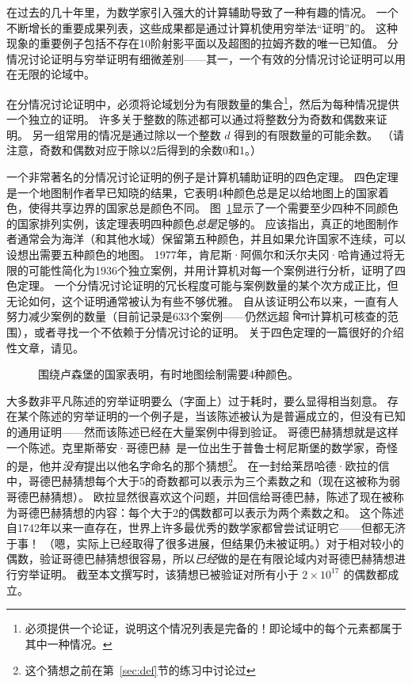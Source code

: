 在过去的几十年里，为数学家引入强大的计算辅助导致了一种有趣的情况。
一个不断增长的重要成果列表，这些成果都是通过计算机使用穷举法“证明”的。
这种现象的重要例子包括不存在10阶射影平面\cite{lam}以及超图的拉姆齐数的唯一已知值\cite{radz}。
分情况讨论证明与穷举证明有细微差别——其一，一个有效的分情况讨论证明可以用在无限的论域中。

在分情况讨论证明中，必须将论域划分为有限数量的集合\footnote{必须提供一个论证，说明这个情况列表是完备的！即论域中的每个元素都属于其中一种情况。}，然后为每种情况提供一个独立的证明。
许多关于整数的陈述都可以通过将整数分为奇数和偶数来证明。
另一组常用的情况是通过除以一个整数 $d$ 得到的有限数量的可能余数。
（请注意，奇数和偶数对应于除以2后得到的余数0和1。）

一个非常著名的分情况讨论证明的例子是计算机辅助证明的四色定理。
四色定理是一个地图制作者早已知晓的结果，它表明4种颜色总是足以给地图上的国家着色，使得共享边界的国家总是颜色不同。
图~\ref{fig:Lux_map}显示了一个需要至少四种不同颜色的国家排列实例，该定理表明四种颜色\emph{总是}足够的。
应该指出，真正的地图制作者通常会为海洋（和其他水域）保留第五种颜色，并且如果允许国家不连续，可以设想出需要五种颜色的地图。
1977年，肯尼斯·阿佩尔和沃尔夫冈·哈肯通过将无限的可能性简化为1936个独立案例，并用计算机对每一个案例进行分析，证明了四色定理。
一个分情况讨论证明的冗长程度可能与案例数量的某个次方成正比，但无论如何，这个证明通常被认为有些不够优雅。
自从该证明公布以来，一直有人努力减少案例的数量（目前记录是633个案例——仍然远超 बिना计算机可核查的范围），或者寻找一个不依赖于分情况讨论的证明。
关于四色定理的一篇很好的介绍性文章，请见\cite{wiki-4color}。

\begin{figure}[!hbtp]
      \begin{center}
            
      \end{center}
      \caption[四色地图]{围绕卢森堡的国家表明，有时地图绘制需要4种颜色。}
      \label{fig:Lux_map}
\end{figure}

大多数非平凡陈述的穷举证明要么（字面上）过于耗时，要么显得相当刻意。
存在某个陈述的穷举证明的一个例子是，当该陈述被认为是普遍成立的，但没有已知的通用证明——然而该陈述已经在大量案例中得到验证。
哥德巴赫猜想就是这样一个陈述。克里斯蒂安·哥德巴赫~\cite{wiki-goldbach}是一位出生于普鲁士柯尼斯堡的数学家，奇怪的是，他并\emph{没有}提出以他名字命名的那个猜想\footnote{这个猜想之前在第~\ref{sec:def}节的练习中讨论过}。
在一封给莱昂哈德·欧拉的信中，哥德巴赫猜想每个大于5的奇数都可以表示为三个素数之和（现在这被称为弱哥德巴赫猜想）。
欧拉显然很喜欢这个问题，并回信给哥德巴赫，陈述了现在被称为哥德巴赫猜想的内容：每个大于2的偶数都可以表示为两个素数之和。
这个陈述自1742年以来一直存在，世界上许多最优秀的数学家都曾尝试证明它——但都无济于事！
（嗯，实际上已经取得了很多进展，但结果仍未被证明。）对于相对较小的偶数，验证哥德巴赫猜想很容易，所以\emph{已经}做的是在有限论域内对哥德巴赫猜想进行穷举证明。
截至本文撰写时，该猜想已被验证对所有小于 $2 \times 10^{17}$ 的偶数都成立。

